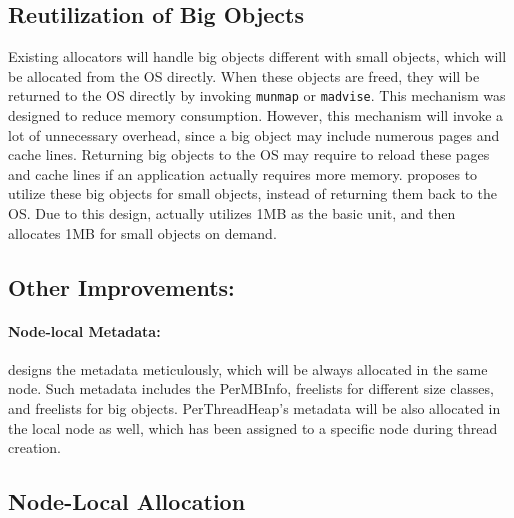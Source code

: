 \subsection{Reutilization of Big Objects} 
Existing allocators will handle big objects different with small objects, which will be allocated from the OS directly. When these objects are freed, they will be returned to the OS directly by invoking \texttt{munmap} or \texttt{madvise}. This mechanism was designed to reduce memory consumption. However, this mechanism will invoke a lot of unnecessary overhead, since a big object may include numerous pages and cache lines.  Returning big objects to the OS may require to reload these pages and cache lines if an application actually requires more memory.  
\NM{} proposes to utilize these big objects for small objects, instead of returning them back to the OS. Due to this design, \NM{} actually utilizes 1MB as the basic unit, and then allocates 1MB for small objects on demand. 

\subsection{Other Improvements:}

\paragraph{Node-local Metadata:} \NM{} designs the metadata meticulously, which will be always allocated in the same node. Such metadata includes the PerMBInfo, freelists for different size classes, and freelists for big objects. PerThreadHeap's metadata will be also allocated in the local node as well, which has been assigned to a specific node during thread creation. 


\subsection{Node-Local Allocation}

